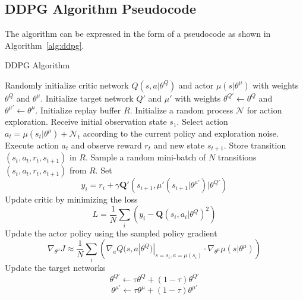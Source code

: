 \subsection{DDPG Algorithm Pseudocode}
The algorithm can be expressed in the form of a pseudocode as shown in Algorithm~\ref{alg:ddpg}.
\begin{algorithm}
    \caption{DDPG Algorithm}
    \label{alg:ddpg}
    \begin{algorithmic}
        \State Randomly initialize critic network $Q(s,a|\theta^Q)$ and actor $\mu(s|\theta^{\mu})$ with weights $\theta^Q$ and $\theta^{\mu}$.
        \State Initialize target network $Q'$ and $\mu'$ with weights $\theta^{Q'} \gets \theta^Q$ and $\theta^{\mu'} \gets \theta^{\mu}$.
        \State Initialize replay buffer $R$.
            \State Initialize a random process $\mathcal{N}$ for action exploration.
            \State Receive initial observation state $s_1$.
                \State Select action $a_t = \mu\left( s_t | \theta^{\mu} \right) + \mathcal{N}_t$ according to the current policy and exploration noise.
                \State Execute action $a_t$ and observe reward $r_t$ and new state $s_{t+1}$.
                \State Store transition $(s_t, a_t, r_t, s_{t+1})$ in $R$.
                \State Sample a random mini-batch of $N$ transitions $(s_t, a_t, r_t, s_{t+1})$ from $R$.
                \State Set
                \[ y_i = r_i + \gamma \mathbf{Q}' \left( s_{i+1}, \mu'\left( s_{i+1} | \theta^{\mu'} \right) | \theta^{Q'} \right) \]
                \State Update critic by minimizing the loss
                \[ L = \frac{1}{N} \sum_{i}\left( y_i - \mathbf{Q}\left( s_i, a_i | \theta^Q \right)^2 \right) \]
                \State Update the actor policy using the sampled policy gradient
                \[ \nabla_{\theta^\mu} J \approx \frac{1}{N} \sum_{i}\left( \nabla_a Q(s,a|\theta^Q)|_{s=s_i, a= \mu(s_i)} \cdot \nabla_{\theta^{\mu}} \mu \left( s | \theta^{\mu} \right) \right) \]
                \State Update the target networks
                \[ \theta^{Q'} \gets \tau \theta^Q + (1- \tau) \theta^{Q'} \]
                \[ \theta^{\mu'} \gets \tau \theta^\mu + (1- \tau) \theta^{\mu'} \]
            \EndFor
        \EndFor 
    \end{algorithmic}
\end{algorithm}